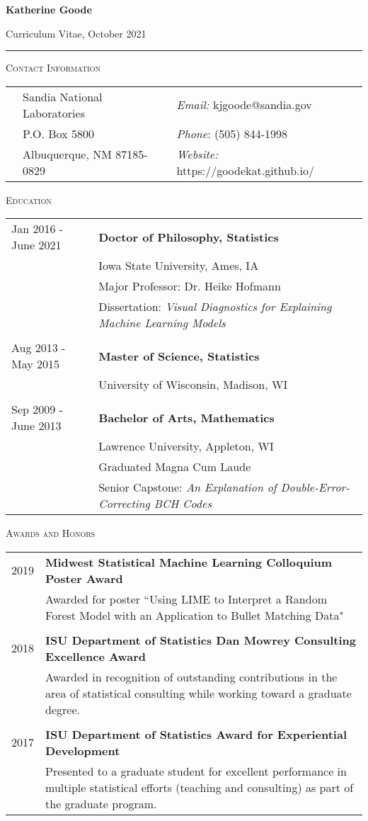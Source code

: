 \documentclass[10pt, oneside]{article}
\begin{document}
\begin{LARGE} \noindent\textbf{Katherine Goode} \end{LARGE} \hfill Curriculum Vitae, October 2021\\
\rule{\textwidth}{1pt}

\vspace{0.25cm}

\noindent \textsc{Contact Information} \hrulefill
\begin{longtable}{p{3.5cm}p{6.2cm}p{6.2cm}}
& Sandia National Laboratories & \emph{Email:} kjgoode@sandia.gov\\
& P.O. Box 5800 & \emph{Phone}: (505) 844-1998\\
& Albuquerque, NM 87185-0829 & \emph{Website:} https://goodekat.github.io/
\end{longtable}

\noindent \textsc{Education} \hrulefill
\begin{longtable}{p{3.5cm}p{13cm}}
\hfill{Jan 2016 - June 2021} & \textbf{Doctor of Philosophy, Statistics}\\
& Iowa State University, Ames, IA\\
& Major Professor: Dr. Heike Hofmann\\
& Dissertation: \emph{Visual Diagnostics for Explaining Machine Learning Models}\\
\\
\hfill{Aug 2013 - May 2015} & \textbf{Master of Science, Statistics}\\
& University of Wisconsin, Madison, WI\\
\\
\hfill{Sep 2009 - June 2013} & \textbf{Bachelor of Arts, Mathematics}\\
& Lawrence University, Appleton, WI\\
& Graduated Magna Cum Laude\\
& Senior Capstone: \emph{An Explanation of Double-Error-Correcting BCH Codes}
\end{longtable}

\noindent \textsc{Awards and Honors} \hrulefill
\begin{longtable}{p{3.5cm}p{13cm}}
\hfill{2019} & \textbf{Midwest Statistical Machine Learning Colloquium Poster Award}\\
& Awarded for poster ``Using LIME to Interpret a Random Forest Model with an Application to Bullet Matching Data"\\
\\
\hfill{2018} & \textbf{ISU Department of Statistics Dan Mowrey Consulting Excellence Award}\\
& Awarded in recognition of outstanding contributions in the area of statistical consulting while working toward a graduate degree.\\
\\
\hfill{2017} & \textbf{ISU Department of Statistics Award for Experiential Development}\\
& Presented to a graduate student for excellent performance in multiple statistical efforts (teaching and consulting) as part of the graduate program.
\end{longtable}
\end{document}
